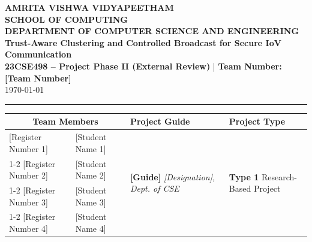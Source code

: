 \documentclass[11pt, a4paper]{article}
\begin{document}
\noindent
\begin{minipage}{\textwidth}
    \centering
    {\Large \textbf{\textcolor{amritaMaroon}{
    AMRITA VISHWA VIDYAPEETHAM \\
    SCHOOL OF COMPUTING \\
    DEPARTMENT OF COMPUTER SCIENCE AND ENGINEERING \\
    }}}
    \vspace{0.2cm}
    {\large \textbf{Trust-Aware Clustering and Controlled Broadcast for Secure IoV Communication}} \\[0.1cm]
    \textbf{23CSE498 -- Project Phase II (External Review)} \quad | \quad \textbf{Team Number: [Team Number]} \\
    \today
\end{minipage}

\vspace{0.3cm}
\hrule
\vspace{0.3cm}

\noindent
\begin{center}
    \renewcommand{\arraystretch}{1.45}
    \setlength{\tabcolsep}{6pt}
    \begin{tabular}{|l|p{4.8cm}|p{4.6cm}|p{3.2cm}|}
        \hline
        \multicolumn{2}{|c|}{\textbf{Team Members}} & \textbf{Project Guide} & \textbf{Project Type} \\
        \hline
        \small [Register Number 1] & \small \raggedright [Student Name 1] &
        \multirow{4}{=}{\raggedright \small \textbf{[Guide]} \newline \textit{[Designation], \newline Dept. of CSE}} &
        \multirow{4}{=}{\raggedright \small \textbf{Type 1} \newline Research-Based Project} \\ \cline{1-2}
        \small [Register Number 2] & \small [Student Name 2] & & \\ \cline{1-2}
        \small [Register Number 3] & \small [Student Name 3] & & \\ \cline{1-2}
        \small [Register Number 4] & \small [Student Name 4] & & \\
        \hline
    \end{tabular}
\end{center}
\vspace{0.2cm}
\end{document}
